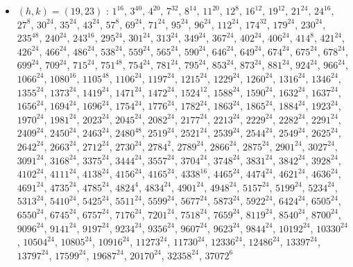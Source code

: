 \begin{itemize}
\item $(h,k)=(19,23)$ : $1^{16}$, $3^{40}$, $4^{20}$, $7^{32}$, $8^{14}$, $11^{20}$, $12^{8}$, $16^{12}$, $19^{12}$, $21^{24}$, $24^{16}$, $27^{8}$, $30^{24}$, $35^{24}$, $43^{24}$, $57^{8}$, $69^{24}$, $71^{24}$, $95^{24}$, $96^{24}$, $112^{24}$, $174^{32}$, $179^{24}$, $230^{24}$, $235^{48}$, $240^{24}$, $243^{16}$, $295^{24}$, $301^{24}$, $313^{24}$, $349^{24}$, $367^{24}$, $402^{24}$, $406^{24}$, $414^{8}$, $421^{24}$, $426^{24}$, $466^{24}$, $486^{24}$, $538^{24}$, $559^{24}$, $565^{24}$, $590^{24}$, $646^{24}$, $649^{24}$, $674^{24}$, $675^{24}$, $678^{24}$, $699^{24}$, $709^{24}$, $715^{24}$, $751^{48}$, $754^{24}$, $781^{24}$, $795^{24}$, $853^{24}$, $873^{24}$, $881^{24}$, $924^{24}$, $966^{24}$, $1066^{24}$, $1080^{16}$, $1105^{48}$, $1106^{24}$, $1197^{24}$, $1215^{24}$, $1229^{24}$, $1260^{24}$, $1316^{24}$, $1346^{24}$, $1355^{24}$, $1373^{24}$, $1419^{24}$, $1471^{24}$, $1472^{24}$, $1524^{12}$, $1588^{24}$, $1590^{24}$, $1632^{24}$, $1637^{24}$, $1656^{24}$, $1694^{24}$, $1696^{24}$, $1754^{24}$, $1776^{24}$, $1782^{24}$, $1863^{24}$, $1865^{24}$, $1884^{24}$, $1923^{24}$, $1970^{24}$, $1981^{24}$, $2023^{24}$, $2045^{24}$, $2082^{24}$, $2177^{24}$, $2213^{24}$, $2229^{24}$, $2282^{24}$, $2291^{24}$, $2409^{24}$, $2450^{24}$, $2463^{24}$, $2480^{48}$, $2519^{24}$, $2521^{24}$, $2539^{24}$, $2544^{24}$, $2549^{24}$, $2625^{24}$, $2642^{24}$, $2663^{24}$, $2712^{24}$, $2730^{24}$, $2784^{2}$, $2789^{24}$, $2866^{24}$, $2875^{24}$, $2901^{24}$, $3027^{24}$, $3091^{24}$, $3168^{24}$, $3375^{24}$, $3444^{24}$, $3557^{24}$, $3704^{24}$, $3748^{24}$, $3831^{24}$, $3842^{24}$, $3928^{24}$, $4102^{24}$, $4111^{24}$, $4138^{24}$, $4156^{24}$, $4165^{24}$, $4338^{16}$, $4465^{24}$, $4474^{24}$, $4621^{24}$, $4636^{24}$, $4691^{24}$, $4735^{24}$, $4785^{24}$, $4824^{4}$, $4834^{24}$, $4901^{24}$, $4948^{24}$, $5157^{24}$, $5199^{24}$, $5234^{24}$, $5313^{24}$, $5410^{24}$, $5425^{24}$, $5511^{24}$, $5599^{24}$, $5677^{24}$, $5873^{24}$, $5922^{24}$, $6424^{24}$, $6505^{24}$, $6550^{24}$, $6745^{24}$, $6757^{24}$, $7176^{24}$, $7201^{24}$, $7518^{24}$, $7659^{24}$, $8119^{24}$, $8540^{24}$, $8700^{24}$, $9096^{24}$, $9141^{24}$, $9197^{24}$, $9234^{24}$, $9356^{24}$, $9607^{24}$, $9623^{24}$, $9844^{24}$, $10192^{24}$, $10330^{24}$, $10504^{24}$, $10805^{24}$, $10916^{24}$, $11273^{24}$, $11730^{24}$, $12336^{24}$, $12486^{24}$, $13397^{24}$, $13797^{24}$, $17599^{24}$, $19687^{24}$, $20170^{24}$, $32358^{24}$, $37072^{6}$
\end{itemize}
